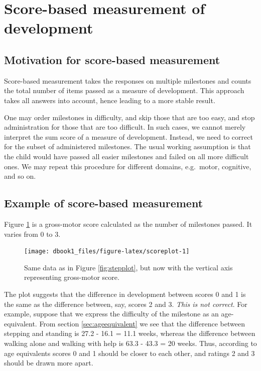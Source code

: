 \documentclass[
]{book}
\begin{document}
\hypertarget{sec:scorebased}{%
\section{Score-based measurement of development}\label{sec:scorebased}}

\hypertarget{sec:motivscorebased}{%
\subsection{Motivation for score-based measurement}\label{sec:motivscorebased}}

Score-based measurement takes the responses on multiple milestones and counts the total number of items passed as a measure of development. This approach takes all answers into account, hence leading to a more stable result.

One may order milestones in difficulty, and skip those that are too easy, and stop administration for those that are too difficult. In such cases, we cannot merely interpret the sum score of a measure of development. Instead, we need to correct for the subset of administered milestones. The usual working assumption is that the child would have passed all easier milestones and failed on all more difficult ones. We may repeat this procedure for different domains, e.g.~motor, cognitive, and so on.

\hypertarget{example-of-score-based-measurement}{%
\subsection{Example of score-based measurement}\label{example-of-score-based-measurement}}

Figure \ref{fig:scoreplot} is a gross-motor score calculated as the number of milestones passed. It varies from 0 to 3.

\begin{figure}

{\centering \texttt{[image: dbook1\_files/figure-latex/scoreplot-1]} 

}

\caption{Same data as in Figure \ref{fig:stepplot}, but now with the vertical axis representing gross-motor score.}\label{fig:scoreplot}
\end{figure}



The plot suggests that the difference in development between scores 0 and 1 is the same as the difference between, say, scores 2 and 3. \emph{This is not correct}. For example, suppose that we express the difficulty of the milestone as an age-equivalent. From section \ref{sec:ageequivalent} we see that the difference between stepping and standing is 27.2 - 16.1 = 11.1 weeks, whereas the difference between walking alone and walking with help is 63.3 - 43.3 = 20 weeks. Thus, according to age equivalents scores 0 and 1 should be closer to each other, and ratings 2 and 3 should be drawn more apart.
\end{document}
